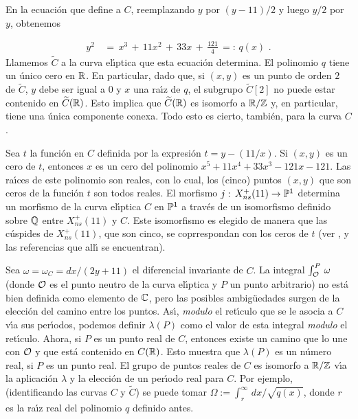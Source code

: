 En la ecuaci\'{o}n que define a $C$, reemplazando $y$ por
$(y-11)/2$ y luego $y/2$ por $y$, obtenemos

\begin{align*}
y^{2} & \,=\,x^{3}\,+\,11x^{2}\,+\,33x\,+\,\frac{121}{4}
\,=:\,q(x)\text{ .}
\end{align*}
Llamemos $\widetilde{C}$ a la curva el\'{\i}ptica que esta ecuaci\'{o}n
determina.
El polinomio $q$ tiene un \'{u}nico cero en $\bb{R}$. En particular,
dado que, si $(x,y)$ es un punto de orden $2$ de $\widetilde{C}$,
$y$ debe ser igual a $0$ y $x$ una ra\'{\i}z de $q$, el subgrupo
$\widetilde{C}[2]$ no puede estar contenido en $\widetilde{C}(\bb{R})$.
Esto implica que
$\widetilde{C}(\bb{R})$ es isomorfo a $\bb{R}/\bb{Z}$ y, en particular,
tiene una \'{u}nica componente conexa. Todo esto es cierto, tambi\'{e}n,
para la curva $C$.

Sea $t$ la funci\'{o}n en $C$ definida por la expresi\'{o}n
$t=y-(11/x)$. Si $(x,y)$ es un cero de $t$, entonces $x$ es un cero del
polinomio $x^{5}+11x^{4}+33x^{3}-121x-121$. Las ra\'{\i}ces de este
polinomio son reales, con lo cual, los (cinco) puntos $(x,y)$ que son
ceros de la funci\'{o}n $t$ son todos reales. El morfismo
$j:\,X_{ns}^{+}(11)\rightarrow\bb{P}^{1}$ determina un morfismo de la
curva el\'{\i}ptica $C$ en $\bb{P}^{1}$ a trav\'{e}s de un
isomorfismo definido sobre $\bb{Q}$ entre $X_{ns}^{+}(11)$ y $C$.
Este isomorfismo es elegido de manera que las c\'{u}spides de
$X_{ns}^{+}(11)$, que son cinco, se coprrespondan con los ceros de $t$
(ver \cite{schoofTzanakisLevelEleven}, y las referencias que all\'{\i} se
encuentran).

Sea $\omega=\omega_{C}=dx/(2y+11)$ el diferencial invariante de $C$.
La integral $\int_{\cal{O}}^{P}\,\omega$ (donde $\cal{O}$ es el
punto neutro de la curva el\'{\i}ptica y $P$ un punto arbitrario)
no est\'{a} bien definida como elemento de $\bb{C}$, pero las
posibles ambig\"{u}edades surgen de la elecci\'{o}n del camino entre
los puntos. As\'{\i}, \textit{modulo} el ret\'{\i}culo que se le asocia
a $C$ v\'{\i}a sus per\'{\i}odos, podemos definir $\lambda(P)$ como el
valor de esta integral \textit{modulo} el ret\'{\i}culo. Ahora, si
$P$ es un punto real de $C$, entonces existe un camino que lo une con
$\cal{O}$ y que est\'{a} contenido en $C(\bb{R})$. Esto muestra que
$\lambda(P)$ es un n\'{u}mero real, si $P$ es un punto real. El grupo
de puntos reales de $C$ es isomorfo a $\bb{R}/\bb{Z}$ v\'{\i}a la
aplicaci\'{o}n $\lambda$ y la elecci\'{o}n de un per\'{\i}odo real
para $C$. Por ejemplo, (identificando las curvas $C$ y $\widetilde{C}$)
se puede tomar
$\Omega:=\int_{r}^{\infty}\,dx/\sqrt{q(x)}$, donde $r$ es la
ra\'{\i}z real del polinomio $q$ definido antes.

